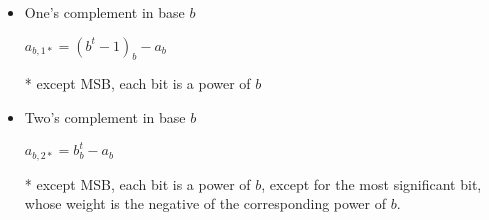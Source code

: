 \begin{itemize}
	\item  One's complement in base $b$ 
		\begin{small}
			\begin{center}	
					$ a_{b,1*} = (b^{t}-1)_b-a_b$ 
			\end{center}
		\end{small}	
		* except MSB, each bit is a power of $b$
	\item  Two's complement in base $b$ 
		\begin{small}
			\begin{center}	
					$ a_{b,2*} = b^{t}_b-a_b$ 				
			\end{center}
		\end{small}	
		* except MSB, each bit is a power of $b$, except for the most significant bit,\\
		whose weight is the negative of the corresponding power of $b$.
\end{itemize}

